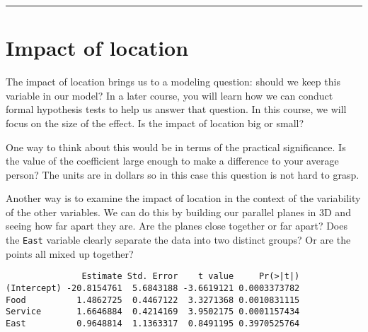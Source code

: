 \documentclass[]{book}
\newenvironment{Shaded}{\begin{snugshade}}{\end{snugshade}}
\newcommand{\KeywordTok}[1]{\textcolor[rgb]{0.13,0.29,0.53}{\textbf{#1}}}
\newcommand{\DataTypeTok}[1]{\textcolor[rgb]{0.13,0.29,0.53}{#1}}
\newcommand{\StringTok}[1]{\textcolor[rgb]{0.31,0.60,0.02}{#1}}
\newcommand{\OperatorTok}[1]{\textcolor[rgb]{0.81,0.36,0.00}{\textbf{#1}}}
\newcommand{\NormalTok}[1]{#1}
\begin{document}
\begin{center}\rule{0.5\linewidth}{\linethickness}\end{center}

\section{Impact of location}\label{impact-of-location}

The impact of location brings us to a modeling question: should we keep
this variable in our model? In a later course, you will learn how we can
conduct formal hypothesis tests to help us answer that question. In this
course, we will focus on the size of the effect. Is the impact of
location big or small?

One way to think about this would be in terms of the practical
significance. Is the value of the coefficient large enough to make a
difference to your average person? The units are in dollars so in this
case this question is not hard to grasp.

Another way is to examine the impact of location in the context of the
variability of the other variables. We can do this by building our
parallel planes in 3D and seeing how far apart they are. Are the planes
close together or far apart? Does the \texttt{East} variable clearly
separate the data into two distinct groups? Or are the points all mixed
up together?

\begin{Shaded}
\end{Shaded}

\begin{verbatim}
               Estimate Std. Error    t value     Pr(>|t|)
(Intercept) -20.8154761  5.6843188 -3.6619121 0.0003373782
Food          1.4862725  0.4467122  3.3271368 0.0010831115
Service       1.6646884  0.4214169  3.9502175 0.0001157434
East          0.9648814  1.1363317  0.8491195 0.3970525764
\end{verbatim}
\end{document}
